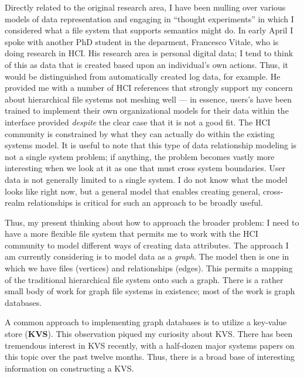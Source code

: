 \documentclass[letterpaper,twocolumn,10pt]{article}
\begin{document}
Directly related to the original research area, I have been mulling over various models of data representation
and engaging in ``thought experiments'' in which I considered what a file system that supports semantics might
do.  In early April I spoke with another PhD student in the deparment, Francesco Vitale, who is doing research
in HCI.  His research area is personal digital data; I tend to think of this as data that is created based upon
an individual's own actions.  Thus, it would be distinguished from automatically created log data, for example.
He provided me with a number of HCI references that strongly support my concern about hierarchical file systems
not meshing well --- in essence, users's have been trained to implement their own organizational models for
their data within the interface provided \textit{despite} the clear case that it is not a good fit.  The HCI
community is constrained by what they can actually do within the existing systems model.  It is useful to note
that this type of data relationship modeling is not a single system problem; if anything, the problem becomes
vastly more interesting when we look at it as one that must cross system boundaries.  User data is not generally
limited to a single system.  I do not know what the model looks like right now, but a general model that
enables creating general, cross-realm relationships is critical for such an approach to be broadly useful.

Thus, my present thinking about how to approach the broader problem: I need to have a more flexible file system
that permits me to work with the HCI community to model different ways of creating data attributes.  The approach
I am currently considering is to model data as a \textit{graph}.  The model then is one in which we have files
(vertices) and relationships (edges).  This permits a mapping of the traditional hierarchical file system onto
such a graph.  There is a rather small body of work for graph file systems in existence; most of the work is
graph databases.

A common approach to implementing graph databases is to utilize a key-value store (\textbf{KVS}).  This
observation piqued my curiosity about KVS. There has been tremendous interest in KVS recently, with a
half-dozen major systems papers on this topic over the past twelve months.  Thus, there is
a broad base of interesting information on constructing a KVS.
\end{document}
